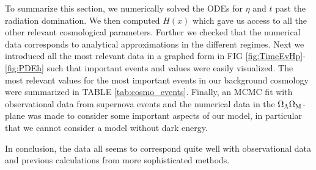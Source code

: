 \documentclass[%
reprint,
 amsmath,amssymb,
 aps,
]{revtex4-2}
\begin{document}
To summarize this section, we numerically solved the ODEs for $\eta$ and $t$ past the radiation domination. We then computed $H(x)$ which gave us access to all the other relevant cosmological parameters. Further we checked that the numerical data corresponds to analytical approximations in the different regimes. Next we introduced all the most relevant data in a graphed form in FIG \ref{fig:TimeEvHp}-\ref{fig:PDEh} such that important events and values were easily visualized. The most relevant values for the most important events in our background cosmology were summarized in TABLE \ref{tab:cosmo_events}. Finally, an MCMC fit with observational data from supernova events and the numerical data in the $\Omega_{\Lambda}\Omega_{\text M}$-plane was made to consider some important aspects of our model, in particular that we cannot consider a model without dark energy. 

In conclusion, the data all seems to correspond quite well with observational data and previous calculations from more sophisticated methods.
\end{document}
